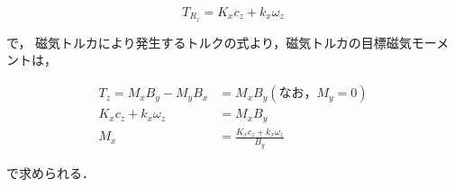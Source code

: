 \begin{equation}
    T_{R_z} = K_x c_z + k_x \omega_z 
\end{equation}

で，
磁気トルカにより発生するトルクの式より，磁気トルカの目標磁気モーメントは，

\begin{equation}
    \begin{aligned}
        T_z = M_x B_y - M_y B_x &= M_x B_y (なお，M_y = 0)\\
         K_x c_z + k_x \omega_z &= M_x B_y\\
                            M_x &= \frac{K_x c_z + k_x \omega_z}{B_y}
    \end{aligned}
\end{equation}

で求められる．
